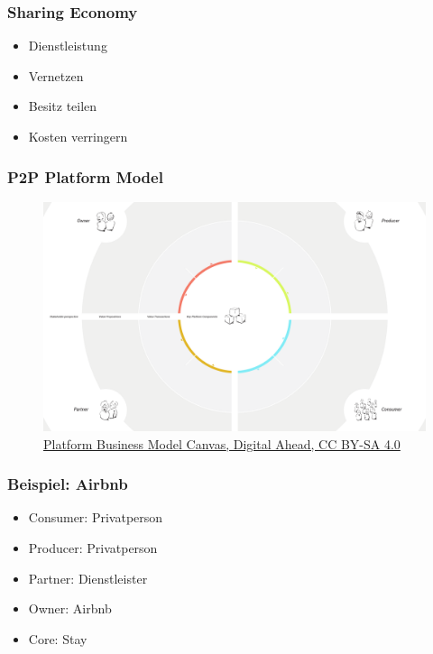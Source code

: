 \begin{frame}
	\frametitle{Sharing Economy}

	\begin{itemize}
		\item Dienstleistung
		\item Vernetzen
		\item Besitz teilen
		\item Kosten verringern
	\end{itemize}
\end{frame}

\begin{frame}
	\frametitle{P2P Platform Model}

	\begin{figure}
		\includegraphics[height=0.8\textheight]{../../img/platformbusinessmodelcanvas.png}
		\caption[Platform Business Model Canvas]{\href{https://www.creatlr.com/template/um2yxrXADndCd8ftsGgY2/platform-business-model-canvas/}{{Platform Business Model Canvas}, Digital Ahead, \href{http://creativecommons.org/licenses/by-sa/4.0/}{CC BY-SA 4.0}}}
	\end{figure}
\end{frame}
\note{}

\begin{frame}
	\frametitle{Beispiel: Airbnb}

	\begin{itemize}
		\item Consumer: Privatperson
		\item Producer: Privatperson
		\item Partner: Dienstleister
		\item Owner: Airbnb
		\item Core: Stay
	\end{itemize}
\end{frame}

